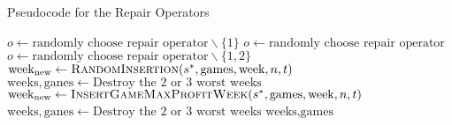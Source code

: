 \documentclass[12pt]{article}
\begin{document}
\begin{algorithm}
    \caption{Pseudocode for the Repair Operators}
    \begin{algorithmic}[1] 
                \State $o\leftarrow \text{randomly choose repair operator}\backslash\{1\}$ 
            \Else
                \State $o\leftarrow \text{randomly choose repair operator}$ 
            \EndIf
                \State $o\leftarrow \text{randomly choose repair operator}\backslash\{1, 2\}$ 
            \EndIf
                    \State $\text{week}_{\text{new}}\leftarrow \Call{RandomInsertion}{s^*, \text{games}, \text{week}, n, t}$
                \EndFor
                \State $\text{weeks}, \text{ganes}\leftarrow \text{Destroy the 2 or 3 worst weeks}$
                    \State $\text{week}_{\text{new}}\leftarrow \Call{InsertGameMaxProfitWeek}{s^*, \text{games}, \text{week}, n, t}$
                \EndFor
                    \State $\text{weeks}, \text{ganes}\leftarrow \text{Destroy the 2 or 3 worst weeks}$
            \EndIf
            \Return $\text{weeks}, \text{games}$
        \EndFunction
    \end{algorithmic}
\end{algorithm}
\end{document}
